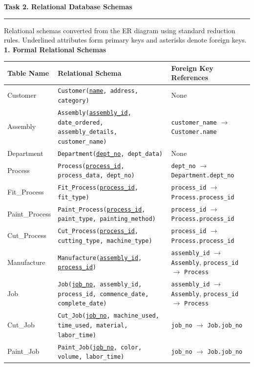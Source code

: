 \documentclass[10pt,letterpaper]{article}
\newcommand{\mysection}[1]{%
    \vspace{6pt}%
    {\large\bfseries\color{titlecolor} #1}\par
    \vspace{-4pt}\rule{\textwidth}{0.6pt}\vspace{4pt}%
}
\newcommand{\mysubsection}[1]{%
    \vspace{4pt}%
    {\normalsize\bfseries\color{titlecolor} #1}\par\vspace{2pt}%
}
\begin{document}
\newpage
{}\label{sec:task2}
\mysection{Task 2. Relational Database Schemas}
\noindent Relational schemas converted from the ER diagram using standard reduction rules. Underlined attributes form primary keys and asterisks denote foreign keys.
\\[0.3cm]
\mysubsection{1. Formal Relational Schemas}
\begin{table}[H]
\centering\scriptsize
\renewcommand{\arraystretch}{1.1}
\begin{tabularx}{\textwidth}{p{2.5cm}Xp{4.4cm}}
\toprule
\textbf{Table Name} & \textbf{Relational Schema} & \textbf{Foreign Key References} \\
\midrule
Customer & \texttt{Customer(\underline{name}, address, category)} & None \\
Assembly & \texttt{Assembly(\underline{assembly\_id}, date\_ordered, assembly\_details, customer\_name)} & \texttt{customer\_name} $\to$ \texttt{Customer.name} \\
Department & \texttt{Department(\underline{dept\_no}, dept\_data)} & None \\
Process & \texttt{Process(\underline{process\_id}, process\_data, dept\_no)} & \texttt{dept\_no} $\to$ \texttt{Department.dept\_no} \\
Fit\_Process & \texttt{Fit\_Process(\underline{process\_id}, fit\_type)} & \texttt{process\_id} $\to$ \texttt{Process.process\_id} \\
Paint\_Process & \texttt{Paint\_Process(\underline{process\_id}, paint\_type, painting\_method)} & \texttt{process\_id} $\to$ \texttt{Process.process\_id} \\
Cut\_Process & \texttt{Cut\_Process(\underline{process\_id}, cutting\_type, machine\_type)} & \texttt{process\_id} $\to$ \texttt{Process.process\_id} \\
Manufacture & \texttt{Manufacture(\underline{assembly\_id}, \underline{process\_id})} & \texttt{assembly\_id} $\to$ \texttt{Assembly}, \texttt{process\_id} $\to$ \texttt{Process} \\
Job & \texttt{Job(\underline{job\_no}, assembly\_id, process\_id, commence\_date, complete\_date)} & \texttt{assembly\_id} $\to$ \texttt{Assembly}, \texttt{process\_id} $\to$ \texttt{Process} \\
Cut\_Job & \texttt{Cut\_Job(\underline{job\_no}, machine\_used, time\_used, material, labor\_time)} & \texttt{job\_no} $\to$ \texttt{Job.job\_no} \\
Paint\_Job & \texttt{Paint\_Job(\underline{job\_no}, color, volume, labor\_time)} & \texttt{job\_no} $\to$ \texttt{Job.job\_no} \\

\end{tabularx}
\end{table}
\end{document}
